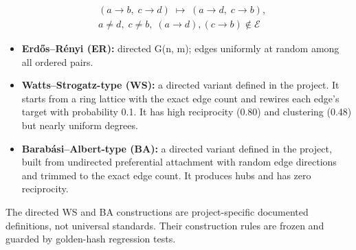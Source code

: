\begin{equation}
\begin{aligned}
&(a \rightarrow b,\; c \rightarrow d) \;\longmapsto\; (a \rightarrow d,\; c \rightarrow b), \\
&a \neq d,\; c \neq b,\; (a \rightarrow d),(c \rightarrow b) \notin \mathcal{E}
\end{aligned}
\label{eq:2}
\end{equation}

\begin{itemize}
\begin{itemize}
\item \textbf{What it preserves:} every node's exact in- and out-degree.
\item \textbf{What it destroys:} the biological partner identities. On the visual graph, reciprocity drops from 0.51 to 0.08 and clustering from 0.38 to 0.10 (means over seeds), and 13\% of edges coincide with biological edges, near the chance level for the given degree sequence.
\end{itemize}
\item \textbf{Erdős–Rényi (ER):} directed G(n, m); edges uniformly at random among all ordered pairs.
\item \textbf{Watts–Strogatz-type (WS):} a directed variant defined in the project. It starts from a ring lattice with the exact edge count and rewires each edge's target with probability 0.1. It has high reciprocity (0.80) and clustering (0.48) but nearly uniform degrees.
\item \textbf{Barabási–Albert-type (BA):} a directed variant defined in the project, built from undirected preferential attachment with random edge directions and trimmed to the exact edge count. It produces hubs and has zero reciprocity.
\end{itemize}

The directed WS and BA constructions are project-specific documented definitions, not universal standards. Their construction rules are frozen and guarded by golden-hash regression tests.

